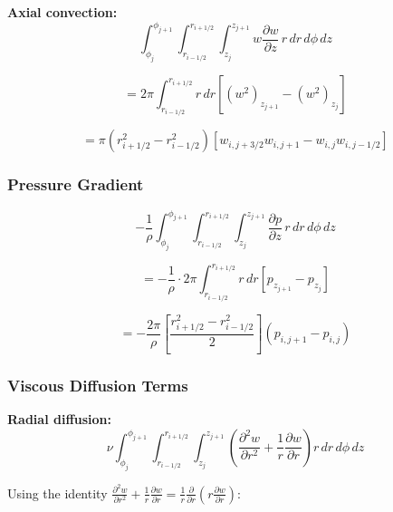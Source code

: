\textbf{Axial convection:}
\begin{equation}
    \int_{\phi_j}^{\phi_{j+1}} \int_{r_{i-1/2}}^{r_{i+1/2}} \int_{z_{j}}^{z_{j+1}} w\frac{\partial w}{\partial z} \, r\,dr\,d\phi\,dz
\end{equation}

\begin{equation}
    = 2\pi \int_{r_{i-1/2}}^{r_{i+1/2}} r\,dr \left[(w^2)_{z_{j+1}} - (w^2)_{z_j}\right]
\end{equation}

\begin{equation}
    \boxed{= \pi(r_{i+1/2}^2 - r_{i-1/2}^2) \left[w_{i,j+3/2} w_{i,j+1} - w_{i,j} w_{i,j-1/2}\right]}
\end{equation}

\subsubsection{Pressure Gradient}

\begin{equation}
    -\frac{1}{\rho}\int_{\phi_j}^{\phi_{j+1}} \int_{r_{i-1/2}}^{r_{i+1/2}} \int_{z_{j}}^{z_{j+1}} \frac{\partial p}{\partial z} \, r\,dr\,d\phi\,dz
\end{equation}

\begin{equation}
    = -\frac{1}{\rho} \cdot 2\pi \int_{r_{i-1/2}}^{r_{i+1/2}} r\,dr \left[p_{z_{j+1}} - p_{z_j}\right]
\end{equation}

\begin{equation}
    \boxed{= -\frac{2\pi}{\rho} \left[\frac{r_{i+1/2}^2 - r_{i-1/2}^2}{2}\right] (p_{i,j+1} - p_{i,j})}
\end{equation}

\subsubsection{Viscous Diffusion Terms}

\textbf{Radial diffusion:}
\begin{equation}
    \nu \int_{\phi_j}^{\phi_{j+1}} \int_{r_{i-1/2}}^{r_{i+1/2}} \int_{z_{j}}^{z_{j+1}} \left(\frac{\partial^2 w}{\partial r^2} + \frac{1}{r}\frac{\partial w}{\partial r}\right) r\,dr\,d\phi\,dz
\end{equation}

Using the identity $\frac{\partial^2 w}{\partial r^2} + \frac{1}{r}\frac{\partial w}{\partial r} = \frac{1}{r}\frac{\partial}{\partial r}\left(r\frac{\partial w}{\partial r}\right)$:

